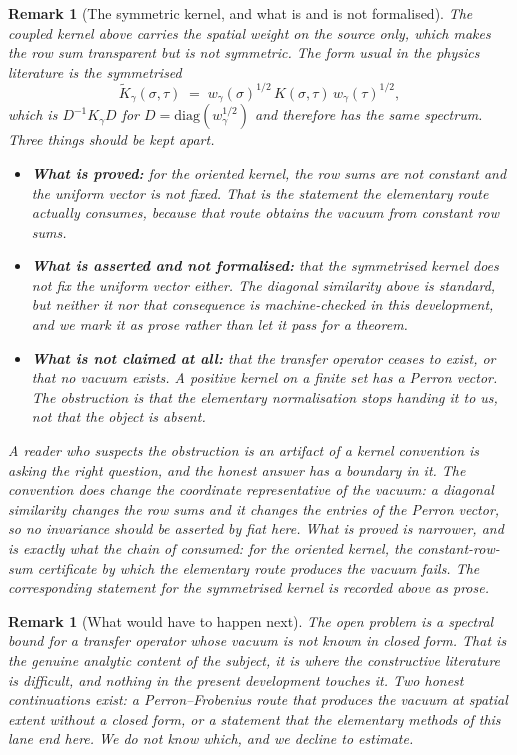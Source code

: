 \documentclass[11pt]{article}
\newtheorem{remark}[theorem]{Remark}
\theoremstyle{definition}
\begin{document}
\begin{remark}[The symmetric kernel, and what is and is not formalised]\label{rem:sym}
The coupled kernel above carries the spatial weight on the source only, which
makes the row sum transparent but is not symmetric.  The form usual in the
physics literature is the symmetrised
\[
  \widetilde K_\gamma(\sigma,\tau) \;=\; w_\gamma(\sigma)^{1/2}\, K(\sigma,\tau)\, w_\gamma(\tau)^{1/2},
\]
which is $D^{-1}K_\gamma D$ for $D=\mathrm{diag}(w_\gamma^{1/2})$ and therefore has
the same spectrum.  Three things should be kept apart.
\begin{itemize}
\item \textbf{What is proved:} for the oriented kernel, the row sums are not
constant and the uniform vector is not fixed.  That is the statement the
elementary route actually consumes, because that route obtains the vacuum
\emph{from} constant row sums.
\item \textbf{What is asserted and not formalised:} that the symmetrised kernel
does not fix the uniform vector either.  The diagonal similarity above is
standard, but neither it nor that consequence is machine-checked in this
development, and we mark it as prose rather than let it pass for a theorem.
\item \textbf{What is \emph{not} claimed at all:} that the transfer operator ceases
to exist, or that no vacuum exists.  A positive kernel on a finite set has a
Perron vector.  The obstruction is that the elementary normalisation stops
handing it to us, not that the object is absent.
\end{itemize}
A reader who suspects the obstruction is an artifact of a kernel convention is
asking the right question, and the honest answer has a boundary in it.  The
convention does change the coordinate representative of the vacuum: a diagonal
similarity changes the row sums and it changes the entries of the Perron
vector, so no invariance should be asserted by fiat here.  What is proved is
narrower, and is exactly what the chain of \cite{ErikssonOSChain} consumed: for
the oriented kernel, the constant-row-sum certificate by which the elementary
route produces the vacuum fails.  The corresponding statement for the
symmetrised kernel is recorded above as prose.
\end{remark}
\begin{remark}[What would have to happen next]
The open problem is a spectral bound for a transfer operator whose vacuum is not
known in closed form.  That is the genuine analytic content of the subject, it is
where the constructive literature is difficult, and nothing in the present
development touches it.  Two honest continuations exist: a Perron--Frobenius
route that produces the vacuum at spatial extent without a closed form, or a
statement that the elementary methods of this lane end here.  We do not know
which, and we decline to estimate.
\end{remark}
\end{document}

